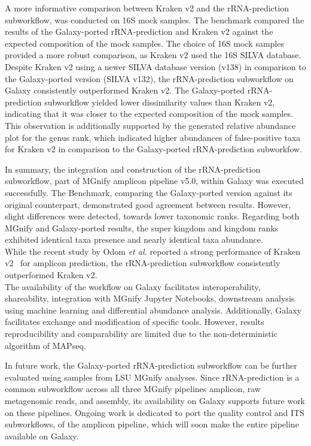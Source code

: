 A more informative comparison between Kraken v2 and the rRNA-prediction subworkflow, was conducted on 16S mock samples. The benchmark compared the results of the Galaxy-ported rRNA-prediction and Kraken v2 against the expected composition of the mock samples. The choice of 16S mock samples provided a more robust comparison, as Kraken v2 used the 16S SILVA database. Despite Kraken v2 using a newer SILVA database version (v138) in comparison to the Galaxy-ported version (SILVA v132), the rRNA-prediction subworkflow on Galaxy consistently outperformed Kraken v2. The Galaxy-ported rRNA-prediction subworkflow yielded lower dissimilarity values than Kraken v2, indicating that it was closer to the expected composition of the mock samples. This observation is additionally supported by the generated relative abundance plot for the genus rank, which indicated higher abundances of false-positive taxa for Kraken v2 in comparison to the Galaxy-ported rRNA-prediction subworkfow.\par
In summary, the integration and construction of the rRNA-prediction subworkflow, part of MGnify amplicon pipeline v5.0, within Galaxy was executed successfully. The Benchmark, comparing the Galaxy-ported version against its original counterpart, demonstrated good agreement between results. However, slight differences were detected, towards lower taxonomic ranks. Regarding both MGnify and Galaxy-ported results, the super kingdom and kingdom ranks exhibited identical taxa presence and nearly identical taxa abundance.\\
While the recent study by Odom \emph{et al.} reported a strong performance of Kraken v2~\cite{odom_metagenomic_2023} for amplicon prediction, the rRNA-prediction subworkflow consistently outperformed Kraken v2.\\
The availability of the workflow on Galaxy facilitates interoperability, shareability, integration with MGnify Jupyter Notebooks, downstream analysis using machine learning and differential abundance analysis. Additionally, Galaxy facilitates exchange and modification of specific tools. However, results reproducibility and comparability are limited due to the non-deterministic algorithm of MAPseq.\par
In future work, the Galaxy-ported rRNA-prediction subworkflow can be further evaluated using samples from LSU MGnify analyses. Since rRNA-prediction is a common subworkflow across all three MGnify pipelines amplicon, raw metagenomic reads, and assembly, its availability on Galaxy supports future work on these pipelines. Ongoing work is dedicated to port the quality control and ITS subworkflows, of the amplicon pipeline, which will soon make the entire pipeline available on Galaxy.